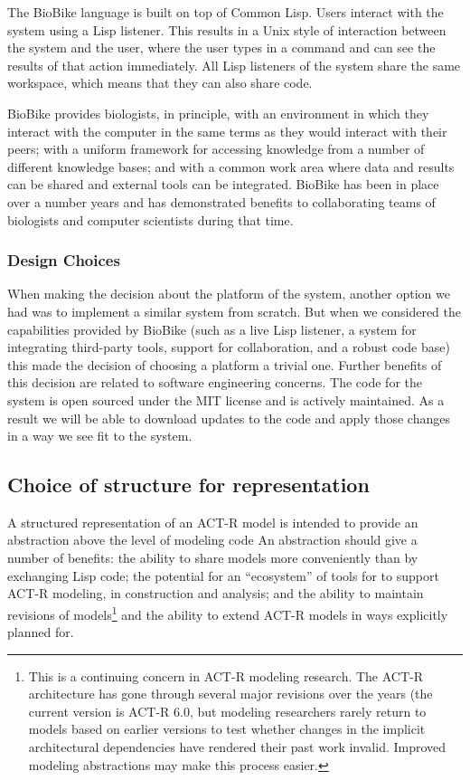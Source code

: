The BioBike language is built on top of Common Lisp. Users interact
with the system using a Lisp listener. This results in a Unix style of
interaction between the system and the user, where the user types in a
command and can see the results of that action immediately. All Lisp
listeners of the system share the same workspace, which means that
they can also share code.

BioBike provides biologists, in principle, with an environment in
which they interact with the computer in the same terms as they would
interact with their peers; with a uniform framework for accessing
knowledge from a number of different knowledge bases; and with a
common work area where data and results can be shared and external
tools can be integrated.  BioBike has been in place over a number
years and has demonstrated benefits to collaborating teams of
biologists and computer scientists during that time\cite{journals/bioinformatics/MassarTES05}.

\subsubsection{Design Choices}

When making the decision about the platform of the system, another
option we had was to implement a similar system from scratch. But when
we considered the capabilities provided by BioBike (such as a live
Lisp listener, a system for integrating third-party tools, support for
collaboration, and a robust code base) this made the decision of
choosing a platform a trivial one.
%
Further benefits of this decision are related to software engineering
concerns. The code for the system is open sourced under the MIT
license and is actively maintained. As a result we will be able to
download updates to the code and apply those changes in a way we see
fit to the system.

\subsection{Choice of structure for representation}
A structured representation of an ACT-R model is intended to provide
an abstraction above the level of modeling code An abstraction should
give a number of benefits: the ability to share models more
conveniently than by exchanging Lisp code; the potential for an
``ecosystem'' of tools for to support ACT-R modeling, in construction
and analysis; and the ability to maintain revisions of
models\footnote{This is a continuing concern in ACT-R modeling
  research.  The ACT-R architecture has gone through several major
  revisions over the years (the current version is ACT-R 6.0, but
  modeling researchers rarely return to models based on earlier
  versions to test whether changes in the implicit architectural
  dependencies have rendered their past work invalid.  Improved
  modeling abstractions may make this process easier.}
%
and the ability to extend ACT-R models in ways explicitly planned for.

